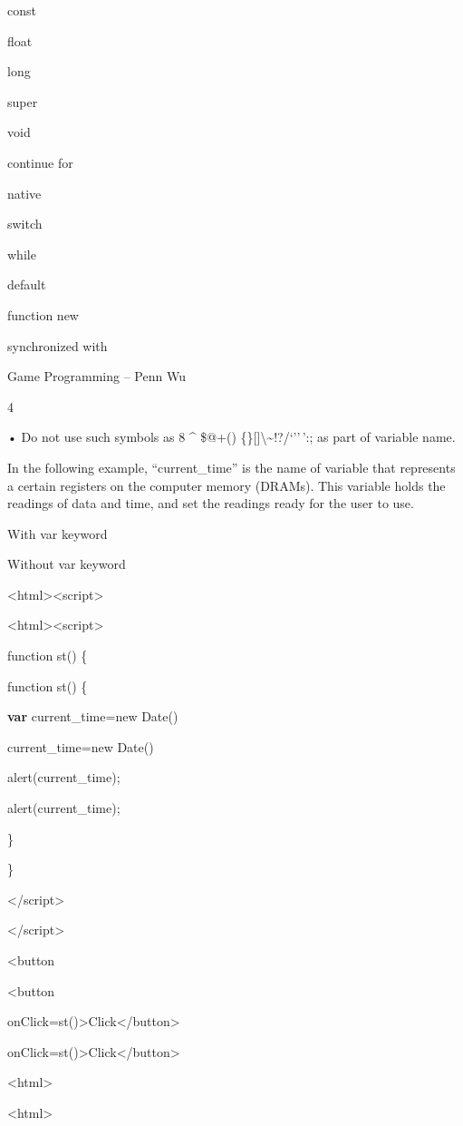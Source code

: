 \documentclass[
]{article}
\begin{document}
const

float

long

super

void

continue for

native

switch

while

default

function new

synchronized with

Game Programming -- Penn Wu

4

\protect\hypertarget{index_split_001.htmlux5cux23p5}{}{}

• Do not use such symbols as 8 \^{} \$@+()
\{\}{[}{]}\textbackslash\textbar\textasciitilde!?/`''\,':; as part of
variable name.

In the following example, ``current\_time'' is the name of variable that
represents a certain registers on the computer memory (DRAMs). This
variable holds the readings of data and time, and set the readings ready
for the user to use.

With var keyword

Without var keyword

\textless html\textgreater\textless script\textgreater{}

\textless html\textgreater\textless script\textgreater{}

function st() \{

function st() \{

\textbf{var} current\_time=new Date()

current\_time=new Date()

alert(current\_time);

alert(current\_time);

\}

\}

\textless/script\textgreater{}

\textless/script\textgreater{}

\textless button

\textless button

onClick=st()\textgreater Click\textless/button\textgreater{}

onClick=st()\textgreater Click\textless/button\textgreater{}

\textless html\textgreater{}

\textless html\textgreater{}
\end{document}
